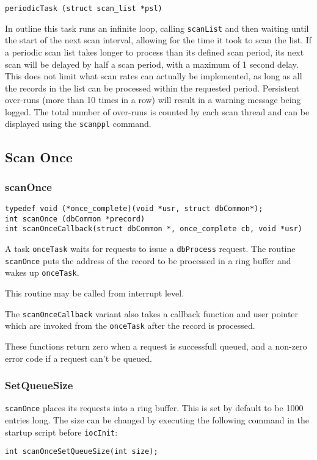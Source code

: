 \begin{verbatim}
periodicTask (struct scan_list *psl)
\end{verbatim}

In outline this task runs an infinite loop, calling \verb|scanList| and then waiting until the start of the next scan interval, allowing for the time it took to scan the list.
If a periodic scan list takes longer to process than its defined scan period, its next scan will be delayed by half a scan period, with a maximum of 1 second delay.
This does not limit what scan rates can actually be implemented, as long as all the records in the list can be processed within the requested period.
Persistent over-runs (more than 10 times in a row) will result in a warning message being logged.
The total number of over-runs is counted by each scan thread and can be displayed using the \verb|scanppl| command.

\subsection{Scan Once}

\subsubsection{scanOnce}

\begin{verbatim}
typedef void (*once_complete)(void *usr, struct dbCommon*);
int scanOnce (dbCommon *precord)
int scanOnceCallback(struct dbCommon *, once_complete cb, void *usr)
\end{verbatim}

A task \verb|onceTask| waits for requests to issue a \verb|dbProcess| request.
The routine \verb|scanOnce| puts the address of the record to be processed in a ring buffer and wakes up \verb|onceTask|.

This routine may be called from interrupt level.

The \verb|scanOnceCallback| variant also takes a callback function and user pointer which are invoked from the \verb|onceTask|
after the record is processed.

These functions return zero when a request is successfull queued, and a non-zero error code if a request can't be queued.

\subsubsection{SetQueueSize}

\verb|scanOnce| places its requests into a ring buffer.
This is set by default to be 1000 entries long.
The size can be changed by executing the following command in the startup script before \verb|iocInit|:

\begin{verbatim}
int scanOnceSetQueueSize(int size);
\end{verbatim}

